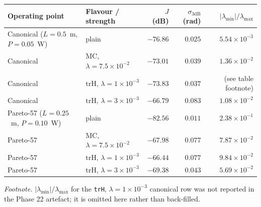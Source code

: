 \documentclass[12pt,a4paper]{article}
\theoremstyle{definition}
\begin{document}
\begin{center}
\begin{tabular}{llrrr}
\toprule
Operating point & Flavour / strength & $J$ (dB) & $\sigma_{3\text{dB}}$ (rad) & $|\lambda_\text{min}|/\lambda_\text{max}$ \\
\midrule
Canonical ($L{=}0.5$~m, $P{=}0.05$~W) & plain                       & $-76.86$ & $0.025$ & $5.54\times10^{-3}$ \\
Canonical                             & MC, $\lambda{=}7.5\times10^{-2}$   & $-73.01$ & $0.039$ & $1.36\times10^{-2}$ \\
Canonical                             & trH, $\lambda{=}1\times10^{-3}$    & $-73.83$ & $0.037$ & (see table footnote) \\
Canonical                             & trH, $\lambda{=}3\times10^{-3}$    & $-66.79$ & $0.083$ & $1.08\times10^{-2}$ \\
Pareto-57 ($L{=}0.25$~m, $P{=}0.10$~W) & plain                      & $-82.56$ & $0.011$ & $2.38\times10^{-1}$ \\
Pareto-57                             & MC, $\lambda{=}7.5\times10^{-2}$   & $-67.98$ & $0.077$ & $7.87\times10^{-2}$ \\
Pareto-57                             & trH, $\lambda{=}1\times10^{-3}$    & $-66.44$ & $0.077$ & $9.84\times10^{-2}$ \\
Pareto-57                             & trH, $\lambda{=}3\times10^{-3}$    & $-69.38$ & $0.043$ & $5.69\times10^{-2}$ \\
\bottomrule
\end{tabular}
\end{center}
\emph{Footnote.} $|\lambda_\text{min}|/\lambda_\text{max}$ for the
\texttt{trH}, $\lambda{=}1\times10^{-3}$ canonical row was not
reported in the Phase 22 artefact; it is omitted here rather than
back-filled.
\end{document}
